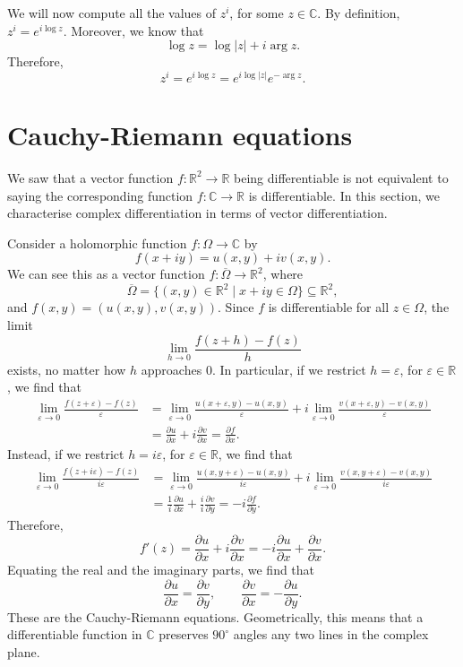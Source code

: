\documentclass[a4paper, openany]{memoir}
\theoremstyle{definition}
\theoremstyle{plain}
\begin{document}
We will now compute all the values of $z^i$, for some $z \in \mathbb{C}$. By definition, $z^i = e^{i \log z}$. Moreover, we know that
\[\log z = \log |z| + i \arg z.\]
Therefore,
\[z^i = e^{i \log z} = e^{i \log |z|} e^{-\arg z}.\]

\newpage

\section{Cauchy-Riemann equations}
We saw that a vector function $f: \mathbb{R}^2 \to \mathbb{R}$ being differentiable is not equivalent to saying the corresponding function $f: \mathbb{C} \to \mathbb{R}$ is differentiable. In this section, we characterise complex differentiation in terms of vector differentiation. 

Consider a holomorphic function $f: \Omega \to \mathbb{C}$ by
\[f(x + iy) = u(x, y) + iv(x, y).\]
We can see this as a vector function $f: \overline{\Omega} \to \mathbb{R}^2$, where
\[\overline{\Omega} = \{(x, y) \in \mathbb{R}^2 \mid x + iy \in \Omega\} \subseteq \mathbb{R}^2,\]
and $f(x, y) = (u(x, y), v(x, y))$. Since $f$ is differentiable for all $z \in \Omega$, the limit
\[\lim_{h \to 0} \frac{f(z + h) - f(z)}{h}\]
exists, no matter how $h$ approaches $0$. In particular, if we restrict $h = \varepsilon$, for $\varepsilon \in \mathbb{R}$, we find that
\begin{align*}
    \lim_{\varepsilon \to 0} \frac{f(z + \varepsilon) - f(z)}{\varepsilon} &= \lim_{\varepsilon \to 0} \frac{u(x + \varepsilon, y) - u(x, y)}{\varepsilon} + i \lim_{\varepsilon \to 0} \frac{v(x + \varepsilon, y) - v(x, y)}{\varepsilon} \\
    &= \frac{\partial u}{\partial x} + i \frac{\partial v}{\partial x} = \frac{\partial f}{\partial x}.
\end{align*}
Instead, if we restrict $h = i \varepsilon$, for $\varepsilon \in \mathbb{R}$, we find that
\begin{align*}
    \lim_{\varepsilon \to 0} \frac{f(z + i\varepsilon) - f(z)}{i\varepsilon} &= \lim_{\varepsilon \to 0} \frac{u(x, y + \varepsilon) - u(x, y)}{i\varepsilon} + i\lim_{\varepsilon \to 0} \frac{v(x, y + \varepsilon) - v(x, y)}{i \varepsilon} \\
    &= \frac{1}{i} \frac{\partial u}{\partial x} + \frac{i}{i} \frac{\partial v}{\partial y} = -i \frac{\partial f}{\partial y}.
\end{align*}
Therefore,
\[f'(z) = \frac{\partial u}{\partial x} + i \frac{\partial v}{\partial x} = -i \frac{\partial u}{\partial x} + \frac{\partial v}{\partial x}.\]
Equating the real and the imaginary parts, we find that
\[\frac{\partial u}{\partial x} = \frac{\partial v}{\partial y}, \qquad \frac{\partial v}{\partial x} = -\frac{\partial u}{\partial y}.\]
These are the Cauchy-Riemann equations. Geometrically, this means that a differentiable function in $\mathbb{C}$ preserves $90^{\circ}$ angles any two lines in the complex plane.
\end{document}
